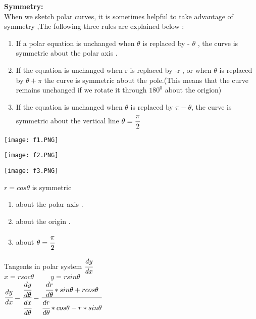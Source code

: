 {\Large\textbf{Symmetry:}}\\
When we sketch polar curves, it is sometimes helpful to take advantage of symmetry ,The following three rules are explained below : 
\begin{enumerate}
    \item If a polar equation is unchanged when $\theta$ is replaced by - $\theta$ , the curve is symmetric about the polar axis .
    \item If the equation is unchanged when r is replaced by -r , or when $\theta$ is replaced by $\theta+\pi$ the curve is symmetric about the pole.(This means that the curve remains unchanged if we rotate it through $180^0$ about the origion)
    \item If the equation is unchanged when $\theta$ is replaced by $\pi-\theta$, the curve is symmetric about the vertical line $\theta=\cfrac{\pi}{2}$
\end{enumerate}
\begin{minipage}{0.3\textwidth}
\texttt{[image: f1.PNG]}
\end{minipage}
\begin{minipage}{.3\textwidth}
\texttt{[image: f2.PNG]}
\end{minipage}
\hfill
\begin{minipage}{.3\textwidth}
\texttt{[image: f3.PNG]}
\end{minipage}
\noindent{\color{smalt(darkpowderblue)}\rule{\linewidth}{.2mm}}
\begin{example}
$r=cos\theta$ is symmetric  
\begin{enumerate}
    \item about the polar axis .
    \item about the origin .
    \item about $\theta=\cfrac{\pi}{2}$
\end{enumerate}
\end{example}
\noindent{\color{smalt(darkpowderblue)}\rule{\linewidth}{.2mm}}
Tangents in polar system $\cfrac{dy}{dx}$ \\
$x=rsoc\theta \hspace{1cm} y=rsin\theta$ \\
$\cfrac{dy}{dx}= \cfrac{\cfrac{dy}{d\theta}}{\cfrac{dx}{d\theta}}= \cfrac{\cfrac{dr}{d\theta}*sin\theta+rcos\theta}{\cfrac{dr}{d\theta}*cos\theta-r*sin\theta}$ \\
